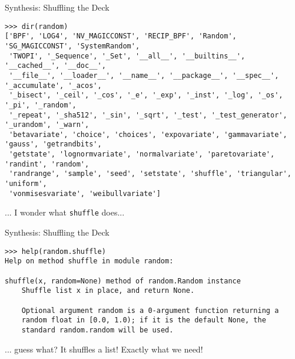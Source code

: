 \begin{frame}[fragile]{Synthesis: Shuffling the Deck}
%
\begin{cmdbox}
\begin{verbatim}
>>> dir(random)
['BPF', 'LOG4', 'NV_MAGICCONST', 'RECIP_BPF', 'Random', 'SG_MAGICCONST', 'SystemRandom',
 'TWOPI', '_Sequence', '_Set', '__all__', '__builtins__', '__cached__', '__doc__', 
 '__file__', '__loader__', '__name__', '__package__', '__spec__', '_accumulate', '_acos',
 '_bisect', '_ceil', '_cos', '_e', '_exp', '_inst', '_log', '_os', '_pi', '_random',
 '_repeat', '_sha512', '_sin', '_sqrt', '_test', '_test_generator', '_urandom', '_warn',
 'betavariate', 'choice', 'choices', 'expovariate', 'gammavariate', 'gauss', 'getrandbits',
 'getstate', 'lognormvariate', 'normalvariate', 'paretovariate', 'randint', 'random',
 'randrange', 'sample', 'seed', 'setstate', 'shuffle', 'triangular', 'uniform',
 'vonmisesvariate', 'weibullvariate']
\end{verbatim}
\end{cmdbox}
%
... I wonder what {\color{blue}\texttt{shuffle}} does...
%
\end{frame}


\begin{frame}[fragile]{Synthesis: Shuffling the Deck}
%
\begin{cmdbox}
\begin{verbatim}
>>> help(random.shuffle)
Help on method shuffle in module random:

shuffle(x, random=None) method of random.Random instance
    Shuffle list x in place, and return None.
    
    Optional argument random is a 0-argument function returning a
    random float in [0.0, 1.0); if it is the default None, the
    standard random.random will be used.

\end{verbatim}
\end{cmdbox}
%
... guess what? It shuffles a list! Exactly what we need!
%
\end{frame}


